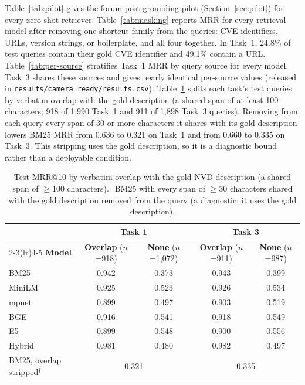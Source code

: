 \documentclass{article}
\begin{document}
Table~\ref{tab:pilot} gives the forum-post grounding pilot (Section~\ref{sec:pilot}) for every zero-shot retriever. Table~\ref{tab:masking} reports MRR for every retrieval model after removing one shortcut family from the queries: CVE identifiers, URLs, version strings, or boilerplate, and all four together. In Task~1, 24.8\% of test queries contain their gold CVE identifier and 49.1\% contain a URL. Table~\ref{tab:per-source} stratifies Task~1 MRR by query source for every model. Task~3 shares these sources and gives nearly identical per-source values (released in \texttt{results/camera\_ready/results.csv}). Table~\ref{tab:overlap} splits each task's test queries by verbatim overlap with the gold description (a shared span of at least 100 characters; 918 of 1,990 Task~1 and 911 of 1,898 Task~3 queries). Removing from each query every span of 30 or more characters it shares with its gold description lowers BM25 MRR from 0.636 to 0.321 on Task~1 and from 0.660 to 0.335 on Task~3. This stripping uses the gold description, so it is a diagnostic bound rather than a deployable condition.

\begin{table}[ht]
\centering
\small
\setlength{\tabcolsep}{4pt}
\caption{Test MRR@10 by verbatim overlap with the gold NVD description (a shared span of $\geq$100 characters). $^\dagger$BM25 with every span of $\geq$30 characters shared with the gold description removed from the query (a diagnostic; it uses the gold description).}
\label{tab:overlap}
\begin{tabular}{lcccc}
\toprule
 & \multicolumn{2}{c}{\textbf{Task 1}} & \multicolumn{2}{c}{\textbf{Task 3}} \\
\cmidrule(lr){2-3}\cmidrule(lr){4-5}
\textbf{Model} & \textbf{Overlap} ($n$=918) & \textbf{None} ($n$=1,072) & \textbf{Overlap} ($n$=911) & \textbf{None} ($n$=987) \\
\midrule
BM25 & 0.942 & 0.373 & 0.943 & 0.399 \\
MiniLM & 0.925 & 0.523 & 0.926 & 0.534 \\
mpnet & 0.899 & 0.497 & 0.903 & 0.519 \\
BGE & 0.916 & 0.541 & 0.918 & 0.549 \\
E5 & 0.899 & 0.548 & 0.900 & 0.556 \\
Hybrid & 0.981 & 0.480 & 0.982 & 0.497 \\
\midrule
BM25, overlap stripped$^\dagger$ & \multicolumn{2}{c}{0.321} & \multicolumn{2}{c}{0.335} \\
\bottomrule
\end{tabular}
\end{table}
\end{document}
